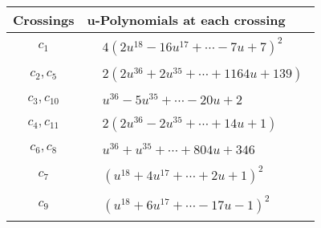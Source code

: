 \documentclass[1p]{elsarticle_modified}
\theoremstyle{definition}
\begin{document}
\begin{tabular}{m{50pt}|m{274pt}}
Crossings & \hspace{64pt}u-Polynomials at each crossing \\
\hline $$\begin{aligned}c_{1}\end{aligned}$$&$\begin{aligned}
&4(2 u^{18}-16 u^{17}+\cdots-7 u+7)^{2}
\end{aligned}$\\
\hline $$\begin{aligned}c_{2},c_{5}\end{aligned}$$&$\begin{aligned}
&2(2 u^{36}+2 u^{35}+\cdots+1164 u+139)
\end{aligned}$\\
\hline $$\begin{aligned}c_{3},c_{10}\end{aligned}$$&$\begin{aligned}
&u^{36}-5 u^{35}+\cdots-20 u+2
\end{aligned}$\\
\hline $$\begin{aligned}c_{4},c_{11}\end{aligned}$$&$\begin{aligned}
&2(2 u^{36}-2 u^{35}+\cdots+14 u+1)
\end{aligned}$\\
\hline $$\begin{aligned}c_{6},c_{8}\end{aligned}$$&$\begin{aligned}
&u^{36}+u^{35}+\cdots+804 u+346
\end{aligned}$\\
\hline $$\begin{aligned}c_{7}\end{aligned}$$&$\begin{aligned}
&(u^{18}+4 u^{17}+\cdots+2 u+1)^{2}
\end{aligned}$\\
\hline $$\begin{aligned}c_{9}\end{aligned}$$&$\begin{aligned}
&(u^{18}+6 u^{17}+\cdots-17 u-1)^{2}
\end{aligned}$\\
\hline
\end{tabular}\\~\\
\newpage\renewcommand{\arraystretch}{1}
\end{document}
